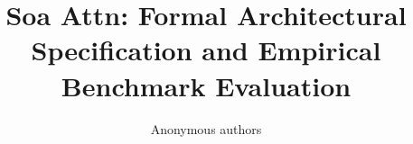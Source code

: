 \title{\textbf{Soa Attn: Formal Architectural Specification and Empirical Benchmark Evaluation}}

\author{Anonymous authors}
